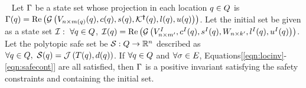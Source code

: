 \begin{theorem}~\label{thm:main} Let $\Gamma$ be a state set whose
  projection in each location $q\in Q$ is
  $\Gamma(q) = \operatorname{\operatorname{Re}}\left(\mathcal{G}\left(V_{n\times
      m(q)}(q),c(q),s(q),\mathcal{K}^{\bm{\dagger}}(q),l(q),u(q)\right)\right)$.
  Let the initial set be given as a state set
  $\mathcal{I}:~\forall q\in Q$,
  $\mathcal{I}(q)=\operatorname{\operatorname{Re}}\left(\mathcal{G}\left(V^I_{n\times m^\prime
  },c^I(q),s^I(q),W_{n\times
      k^\prime},l^I(q),u^I(q)\right)\right)$.  Let the polytopic safe set
  be $\mathcal{S}:Q\rightarrow\mathbb{R}^n$ described as $\forall
  q\in Q,~\mathcal{S}(q)=\mathcal{J}\left(T(q),d(q)\right)$.
  If $\forall q\in Q$ and $\forall \sigma\in E$,
  Equations[\ref{eqn:locinv}-\ref{eqn:safecont}] are all
  satisfied, then $\Gamma$ is a positive invariant satisfying the
  safety constraints and containing the initial set.
\end{theorem}
